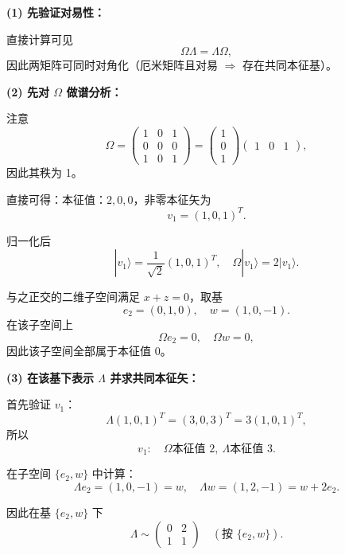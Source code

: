 \begin{solution}
\answer

\vspace{0.3em}
\textbf{(1) 先验证对易性：}

直接计算可见
\[
\Omega\Lambda=\Lambda\Omega,
\]
因此两矩阵可同时对角化（厄米矩阵且对易 $\Rightarrow$ 存在共同本征基）。

\vspace{0.5em}
\textbf{(2) 先对 $\Omega$ 做谱分析：}

注意
\[
\Omega=
\begin{pmatrix}
1&0&1\\
0&0&0\\
1&0&1
\end{pmatrix}
=
\begin{pmatrix}1\\0\\1\end{pmatrix}
\begin{pmatrix}1&0&1\end{pmatrix},
\]
因此其秩为 1。

直接可得：本征值：$2,0,0$，非零本征矢为
\[
v_1=(1,0,1)^T.
\]

归一化后
\[
|v_1\rangle=\frac{1}{\sqrt2}(1,0,1)^T,\quad \Omega|v_1\rangle=2|v_1\rangle.
\]

与之正交的二维子空间满足 $x+z=0$，取基
\[
e_2=(0,1,0),\quad w=(1,0,-1).
\]
在该子空间上
\[
\Omega e_2=0,\quad \Omega w=0,
\]
因此该子空间全部属于本征值 0。

\vspace{0.5em}
\textbf{(3) 在该基下表示 $\Lambda$ 并求共同本征矢：}

首先验证 $v_1$：
\[
\Lambda(1,0,1)^T=(3,0,3)^T=3(1,0,1)^T,
\]
所以
\[
v_1:\quad \Omega\text{本征值 }2,\ \Lambda\text{本征值 }3.
\]

在子空间 $\{e_2,w\}$ 中计算：
\[
\Lambda e_2=(1,0,-1)=w,\quad
\Lambda w=(1,2,-1)=w+2e_2.
\]

因此在基 $\{e_2,w\}$ 下
\[
\Lambda \sim
\begin{pmatrix}
0&2\\
1&1
\end{pmatrix}
\quad(\text{按 } \{e_2,w\}).
\]


\end{solution}
